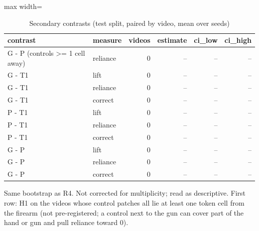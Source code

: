 \begin{table}[htbp]
\centering
\scriptsize
\caption{Secondary contrasts (test split, paired by video, mean over seeds)}\label{tab:R7}
\begin{adjustbox}{max width=\textwidth}
\begin{tabular}{llrrrr}
\toprule
contrast & measure & videos & estimate & ci\_\allowbreak{}low & ci\_\allowbreak{}high \\
\midrule
G - P (controls >= 1 cell away) & reliance & 0 & -- & -- & -- \\
G - T1 & lift & 0 & -- & -- & -- \\
G - T1 & reliance & 0 & -- & -- & -- \\
G - T1 & correct & 0 & -- & -- & -- \\
P - T1 & lift & 0 & -- & -- & -- \\
P - T1 & reliance & 0 & -- & -- & -- \\
P - T1 & correct & 0 & -- & -- & -- \\
G - P & lift & 0 & -- & -- & -- \\
G - P & reliance & 0 & -- & -- & -- \\
G - P & correct & 0 & -- & -- & -- \\
\bottomrule
\end{tabular}
\end{adjustbox}
\par\smallskip\parbox{\textwidth}{\footnotesize Same bootstrap as R4. Not corrected for multiplicity; read as descriptive. First row: H1 on the videos whose control patches all lie at least one token cell from the firearm (not pre-registered; a control next to the gun can cover part of the hand or gun and pull reliance toward 0).}
\end{table}
